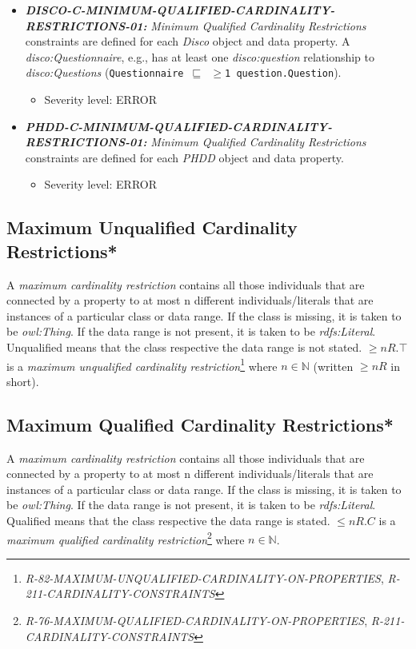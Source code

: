 \documentclass{llncs}
\newcommand{\ms}[1]{\texttt{#1}}
\begin{document}
\begin{itemize}
	\item \textbf{{\em DISCO-C-MINIMUM-QUALIFIED-CARDINALITY-RESTRICTIONS-01:}}
	{\em Minimum Qualified Cardinality Restrictions} constraints are defined for each \emph{Disco} object and data property.
  A {\em disco:Questionnaire}, e.g., has at least one {\em disco:question} relationship to {\em disco:Questions} (\ms{Questionnaire $\sqsubseteq$ $\geq$1 question.Question}).
	\begin{itemize}
		\item Severity level: ERROR
	\end{itemize}
\end{itemize}

\begin{itemize}
	\item \textbf{{\em PHDD-C-MINIMUM-QUALIFIED-CARDINALITY-RESTRICTIONS-01:}}
	{\em Minimum Qualified Cardinality Restrictions} constraints are defined for each \emph{PHDD} object and data property.
	\begin{itemize}
		\item Severity level: ERROR
	\end{itemize}
\end{itemize}

\subsection{Maximum Unqualified Cardinality Restrictions*}

A \emph{maximum cardinality restriction} contains all those individuals that are connected by a property to at most n different individuals/literals that are instances of a particular class or data range. If the class is missing, it is taken to be \emph{owl:Thing}. If the data range is not present, it is taken to be \emph{rdfs:Literal}.
Unqualified means that the class respective the data range is not stated. 
$\geq n R. \top$ is a \emph{maximum unqualified cardinality restriction}\footnote{\emph{R-82-MAXIMUM-UNQUALIFIED-CARDINALITY-ON-PROPERTIES}, \emph{R-211-CARDINALITY-CONSTRAINTS}} where $n \in \mathbb{N}$ (written $\geq  n R$ in short).

\subsection{Maximum Qualified Cardinality Restrictions*}

A \emph{maximum cardinality restriction} contains all those individuals that are connected by a property to at most n different individuals/literals that are instances of a particular class or data range. If the class is missing, it is taken to be \emph{owl:Thing}. If the data range is not present, it is taken to be \emph{rdfs:Literal}.
Qualified means that the class respective the data range is stated. 
$\leq n R. C$ is a \emph{maximum qualified cardinality restriction}\footnote{\emph{R-76-MAXIMUM-QUALIFIED-CARDINALITY-ON-PROPERTIES}, \emph{R-211-CARDINALITY-CONSTRAINTS}} where $n \in \mathbb{N}$.
\end{document}
